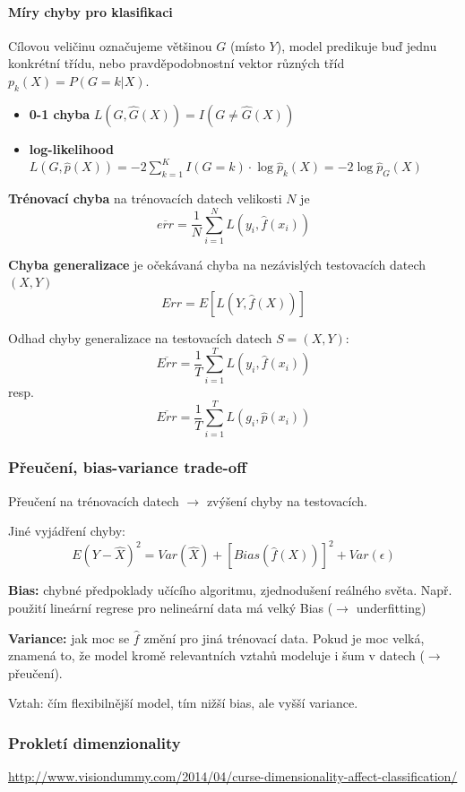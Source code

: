 \documentclass[11pt]{report} %
\numberwithin{equation}{section}
\begin{document}
\paragraph{Míry chyby pro klasifikaci}
Cílovou veličinu označujeme většinou $G$ (místo $Y$), model predikuje buď jednu konkrétní třídu, nebo pravděpodobnostní vektor různých tříd $p_k(X) = P(G=k|X)$.
\begin{itemize}
	\item \textbf{0-1 chyba} $L(G,\hat{G}(X)) = I(G \neq \hat{G}(X))$
	\item \textbf{log-likelihood} $L(G,\hat{p}(X)) = -2\sum_{k=1}^{K}I(G=k)\cdot \log \hat{p}_k(X) = -2\log \hat{p}_G(X)$
\end{itemize}

\textbf{Trénovací chyba} na trénovacích datech velikosti $N$ je 
$$\overline{err} = \frac{1}{N}\sum_{i=1}^{N}L(y_i, \hat{f}(x_i))$$

\textbf{Chyba generalizace} je očekávaná chyba na nezávislých testovacích datech $(X,Y)$
$$Err = E[L(Y,\hat{f}(X))]$$

Odhad chyby generalizace na testovacích datech $S = (X,Y)$:
$$\overline{Err} = \frac{1}{T}\sum_{i=1}^{T}L(y_i, \hat{f}(x_i))$$
resp.
$$\overline{Err} = \frac{1}{T}\sum_{i=1}^{T}L(g_i, \hat{p}(x_i))$$

\subsubsection{Přeučení, bias-variance trade-off}
Přeučení na trénovacích datech $\to$ zvýšení chyby na testovacích.

Jiné vyjádření chyby:
$$E(Y - \hat{X})^2 = Var(\hat{X}) + [Bias(\hat{f}(X))]^2 + Var(\epsilon)$$

\textbf{Bias:} chybné předpoklady učícího algoritmu, zjednodušení reálného světa. Např. použití lineární regrese pro nelineární data má velký Bias ($\to$ underfitting)

\textbf{Variance:} jak moc se $\hat{f}$ změní pro jiná trénovací data. Pokud je moc velká, znamená to, že model kromě relevantních vztahů modeluje i šum v datech ($\to$ přeučení).

Vztah: čím flexibilnější model, tím nižší bias, ale vyšší variance.

\subsubsection{Prokletí dimenzionality}
\url{http://www.visiondummy.com/2014/04/curse-dimensionality-affect-classification/}
\end{document}
